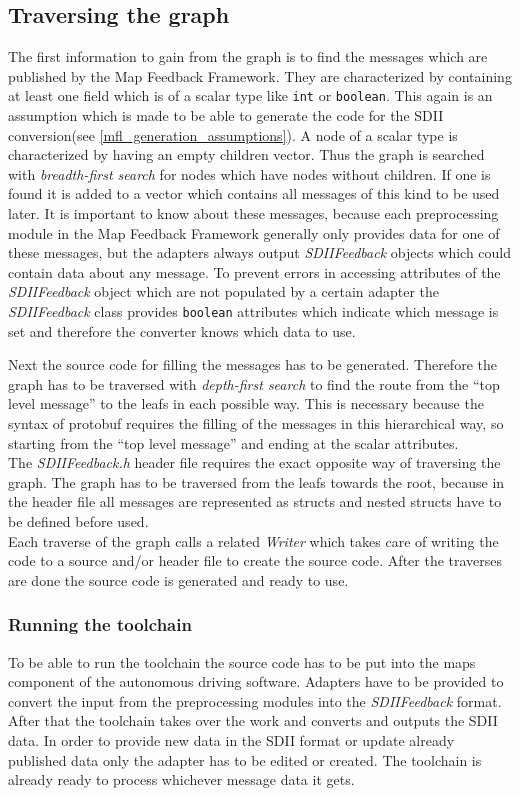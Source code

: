 \subsection{Traversing the graph}
\label{mfl_generation_traverse}
The first information to gain from the graph is to find the messages which are published by the Map Feedback Framework. They are characterized by containing at least one field which is of a scalar type like \verb|int| or \verb|boolean|. This again is an assumption which is made to be able to generate the code for the SDII conversion(see \ref{mfl_generation_assumptions}). A node of a scalar type is characterized by having an empty children vector. Thus the graph is searched with \emph{breadth-first search} for nodes which have nodes without children. If one is found it is added to a vector which contains all messages of this kind to be used later. It is important to know about these messages, because each preprocessing module in the Map Feedback Framework generally only provides data for one of these messages, but the adapters always output \emph{SDIIFeedback} objects which could contain data about any message. To prevent errors in accessing attributes of the \emph{SDIIFeedback} object which are not populated by a certain adapter the \emph{SDIIFeedback} class provides \verb|boolean| attributes which indicate which message is set and therefore the converter knows which data to use.\par
Next the source code for filling the messages has to be generated. Therefore the graph has to be traversed with \emph{depth-first search} to find the route from the \enquote{top level message} to the leafs in each possible way. This is necessary because the syntax of protobuf requires the filling of the messages in this hierarchical way, so starting from the \enquote{top level message} and ending at the scalar attributes.\\
The \emph{SDIIFeedback.h} header file requires the exact opposite way of traversing the graph. The graph has to be traversed from the leafs towards the root, because in the header file all messages are represented as structs and nested structs have to be defined before used.\\
Each traverse of the graph calls a related \emph{Writer} which takes care of writing the code to a source and/or header file to create the source code. After the traverses are done the source code is generated and ready to use.
\subsubsection{Running the toolchain}
\label{mfl_generation_running}
To be able to run the toolchain the source code has to be put into the maps component of the autonomous driving software. Adapters have to be provided to convert the input from the preprocessing modules into the \emph{SDIIFeedback} format. After that the toolchain takes over the work and converts and outputs the SDII data. In order to provide new data in the SDII format or update already published data only the adapter has to be edited or created. The toolchain is already ready to process whichever message data it gets.